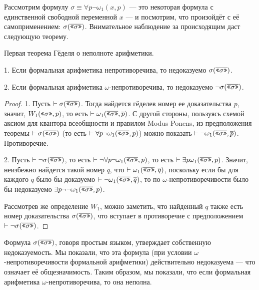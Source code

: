 Рассмотрим формулу $\sigma \equiv \forall p \neg \omega_1(x,p)$ --- это некоторая формула
с единственной свободной переменной $x$ --- и посмотрим, что произойдёт с её самоприменением:
$\sigma(\overline{\texttt{<<}\sigma\texttt{>>}})$. Внимательное наблюдение за
происходящим даст следующую теорему.

\begin{theorem}{Первая теорема Гёделя о неполноте арифметики.}

1. Если формальная арифметика непротиворечива, то недоказуемо $\sigma(\overline{\texttt{<<}\sigma\texttt{>>}})$.

2. Если формальная арифметика $\omega$-непротиворечива, то недоказуемо $\neg \sigma(\overline{\texttt{<<}\sigma\texttt{>>}})$.
\end{theorem}

\begin{proof}
1. Пусть $\vdash \sigma(\overline{\texttt{<<}\sigma\texttt{>>}})$. Тогда найдется гёделев номер ее 
доказательства $p$, значит, $W_1(\texttt{<<}\sigma\texttt{>>},p)$, то есть $\vdash \omega_1 (\overline{\texttt{<<}\sigma\texttt{>>}},\overline{p})$. 
С другой стороны, пользуясь схемой аксиом для квантора всеобщности и правилом Modus Ponens, из 
предположения теоремы $\vdash \sigma(\overline{\texttt{<<}\sigma\texttt{>>}})$ 
(то есть $\vdash \forall p \neg \omega_1(\overline{\texttt{<<}\sigma\texttt{>>}},p)$)
можно показать $\vdash \neg \omega_1(\overline{\texttt{<<}\sigma\texttt{>>}},\overline{p})$. 
Противоречие.

2. Пусть $\vdash \neg \sigma(\overline{\texttt{<<}\sigma\texttt{>>}})$, то есть 
$\vdash \neg \forall p \neg \omega_1(\overline{\texttt{<<}\sigma\texttt{>>}},p)$,
то есть $\vdash \exists p \omega_1(\overline{\texttt{<<}\sigma\texttt{>>}},p)$.
Значит, неизбежно найдется такой номер $q$, что
$\vdash \omega_1 (\overline{\texttt{<<}\sigma\texttt{>>}},\overline{q})$, поскольку 
если бы для каждого $q$ было бы доказуемо $\vdash \neg \omega_1 (\overline{\texttt{<<}\sigma\texttt{>>}},\overline{q})$,
то по $\omega$-непротиворечивости было бы недоказуемо
$\exists p \neg\neg \omega_1(\overline{\texttt{<<}\sigma\texttt{>>}},p)$.

Рассмотрев же определение $W_1$, можно заметить, что найденный $q$ также есть
номер доказательства $\sigma(\overline{\texttt{<<}\sigma\texttt{>>}})$, что
вступает в противоречие с предположением $\vdash \neg \sigma(\overline{\texttt{<<}\sigma\texttt{>>}})$.
\end{proof}

Формула $\sigma(\overline{\texttt{<<}\sigma\texttt{>>}})$, говоря простым языком, утверждает 
собственную недоказуемость. Мы показали, что эта формула (при условии 
$\omega$-непротиворечивости формальной арифметики) действительно 
недоказуема --- что означает её общезначимость. Таким образом, мы 
показали, что если формальная арифметика $\omega$-непротиворечива, 
то она неполна.

